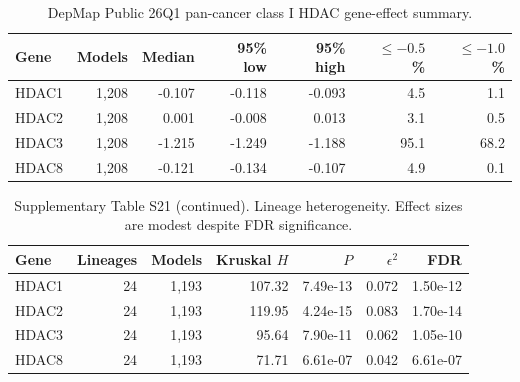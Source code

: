 \begingroup
\small
\begin{table}[H]
\centering
\caption{DepMap Public 26Q1 pan-cancer class I HDAC gene-effect summary.}
\label{tab:s_depmap}
\begin{tabular}{@{}lrrrrrr@{}}
\toprule
Gene & Models & Median & 95\% low & 95\% high & $\leq-0.5$ \% & $\leq-1.0$ \% \\
\midrule
HDAC1 & 1,208 & -0.107 & -0.118 & -0.093 & 4.5 & 1.1 \\
HDAC2 & 1,208 & 0.001 & -0.008 & 0.013 & 3.1 & 0.5 \\
HDAC3 & 1,208 & -1.215 & -1.249 & -1.188 & 95.1 & 68.2 \\
HDAC8 & 1,208 & -0.121 & -0.134 & -0.107 & 4.9 & 0.1 \\
\bottomrule
\end{tabular}
\end{table}
\endgroup
\begingroup
\small
\begin{table}[H]
\centering
\caption*{Supplementary Table S21 (continued). Lineage heterogeneity. Effect sizes are modest despite FDR significance.}
\begin{tabular}{@{}lrrrrrr@{}}
\toprule
Gene & Lineages & Models & Kruskal $H$ & $P$ & $\epsilon^2$ & FDR \\
\midrule
HDAC1 & 24 & 1,193 & 107.32 & 7.49e-13 & 0.072 & 1.50e-12 \\
HDAC2 & 24 & 1,193 & 119.95 & 4.24e-15 & 0.083 & 1.70e-14 \\
HDAC3 & 24 & 1,193 & 95.64 & 7.90e-11 & 0.062 & 1.05e-10 \\
HDAC8 & 24 & 1,193 & 71.71 & 6.61e-07 & 0.042 & 6.61e-07 \\
\bottomrule
\end{tabular}
\end{table}
\endgroup
